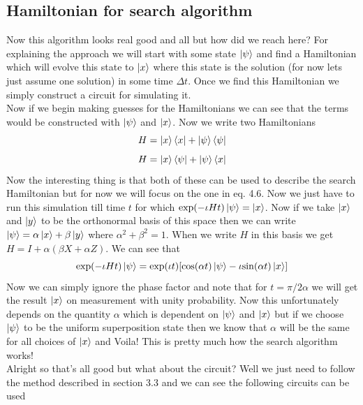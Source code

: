 \documentclass{report}
\begin{document}
\subsection{Hamiltonian for search algorithm}
Now this algorithm looks real good and all but how did we reach here? For explaining the approach we will start with some state $\ket{\psi}$ and find a Hamiltonian which will evolve this state to $\ket{x}$ where this state is the solution (for now lets just assume one solution) in some time $\Delta{t}$. Once we find this Hamiltonian we simply construct a circuit for simulating it.\\
Now if we begin making guesses for the Hamiltonians we can see that the terms would be constructed with $\ket{\psi}$ and $\ket{x}$. Now we write two Hamiltonians
\begin{equation}H = \ket{x}\bra{x} + \ket{\psi}\bra{\psi}\end{equation}
\begin{equation}H = \ket{x}\bra{\psi} + \ket{\psi}\bra{x}\end{equation}
Now the interesting thing is that both of these can be used to describe the search Hamiltonian but for now we will focus on the one in eq. 4.6. Now we just have to run this simulation till time $t$ for which $\exp(-\iota{Ht})\ket{\psi} = \ket{x}$. Now if we take $\ket{x}$ and $\ket{y}$ to be the orthonormal basis of this space then we can write $\ket{\psi} = \alpha\ket{x} + \beta\ket{y}$ where $\alpha^2 + \beta^2 = 1$. When we write $H$ in this basis we get $H = I + \alpha(\beta{X} + \alpha{Z})$. We can see that 
$$\exp(-\iota{Ht})\ket{\psi} = \exp(\iota{t})[\cos(\alpha{t})\ket{\psi} - \iota{\sin(\alpha{t})}\ket{x}]$$
Now we can simply ignore the phase factor and note that for $t = \pi/2\alpha$ we will get the result $\ket{x}$ on measurement with unity probability. Now this unfortunately depends on the quantity $\alpha$ which is dependent on $\ket{\psi}$ and $\ket{x}$ but if we choose $\ket{\psi}$ to be the uniform superposition state then we know that $\alpha$ will be the same for all choices of $\ket{x}$ and Voila! This is pretty much how the search algorithm works!\\
Alright so that's all good but what about the circuit? Well we just need to follow the method described in section 3.3 and we can see the following circuits can be used
\end{document}

